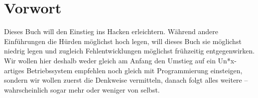 
\chapter{Vorwort}

Dieses Buch will den Einstieg ins Hacken erleichtern. Während andere Einführungen die Hürden möglichst hoch legen, will dieses Buch sie möglichst niedrig legen und zugleich Fehlentwicklungen möglichst frühzeitig entgegenwirken. Wir wollen hier deshalb weder gleich am Anfang den Umstieg auf ein Un*x-artiges Betriebssystem empfehlen noch gleich mit Programmierung einsteigen, sondern wir wollen zuerst die Denkweise vermitteln, danach folgt alles weitere – wahrscheinlich sogar mehr oder weniger von selbst.

